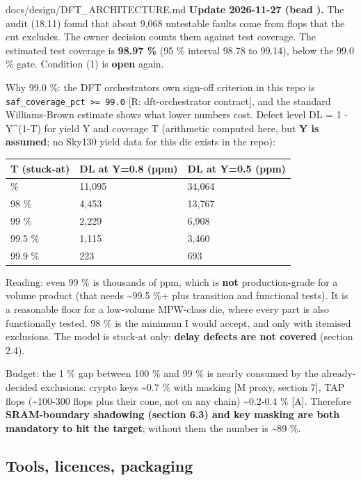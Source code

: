 \begin{relocated}{docs/design/DFT_ARCHITECTURE.md}
\textbf{Update 2026-11-27 (bead ).} The audit (18.11)
found that about 9,068 untestable faults come from flops that the cut
excludes. The owner decision counts them against test coverage. The
estimated test coverage is \textbf{98.97 \%} (95 \% interval 98.78 to
99.14), below the 99.0 \% gate. Condition (1) is \textbf{open} again.

Why 99.0 \%: the DFT orchestrator\textquotesingle s own sign-off
criterion in this repo is
\texttt{saf\_\allowbreak{}coverage\_\allowbreak{}pct\ >=\allowbreak{}\ 99.\allowbreak{}0}
{[}R: dft-orchestrator contract{]}, and the standard Williams-Brown
estimate shows what lower numbers cost. Defect level DL = 1 - Y\^{}(1-T)
for yield Y and coverage T (arithmetic computed here, but \textbf{Y is
assumed}; no Sky130 yield data for this die exists in the repo):

{
\begin{longtable}[]{@{}lll@{}}
\toprule\noalign{}
T (stuck-at) & DL at Y=0.8 (ppm) & DL at Y=0.5 (ppm) \\
\midrule\noalign{}
\endhead
\bottomrule\noalign{}
\endlastfoot
95 \% & 11,095 & 34,064 \\
98 \% & 4,453 & 13,767 \\
99 \% & 2,229 & 6,908 \\
99.5 \% & 1,115 & 3,460 \\
99.9 \% & 223 & 693 \\
\end{longtable}
}

Reading: even 99 \% is thousands of ppm, which is \textbf{not}
production-grade for a volume product (that needs \textasciitilde99.5
\%+ plus transition and functional tests). It is a reasonable floor for
a low-volume MPW-class die, where every part is also functionally
tested. 98 \% is the minimum I would accept, and only with itemised
exclusions. The model is stuck-at only: \textbf{delay defects are not
covered} (section 2.4).

Budget: the 1 \% gap between 100 \% and 99 \% is nearly consumed by the
already-decided exclusions: crypto keys \textasciitilde0.7 \% with
masking {[}M proxy, section 7{]}, TAP flops (\textasciitilde100-300
flops plus their cone, not on any chain) \textasciitilde0.2-0.4 \%
{[}A{]}. Therefore \textbf{SRAM-boundary shadowing (section 6.3) and key
masking are both mandatory to hit the target}; without them the number
is \textasciitilde89 \%.

\subsection{Tools, licences, packaging}\label{tm:ch:dft-architecture:22-tools-licences-packaging}


\end{relocated}
